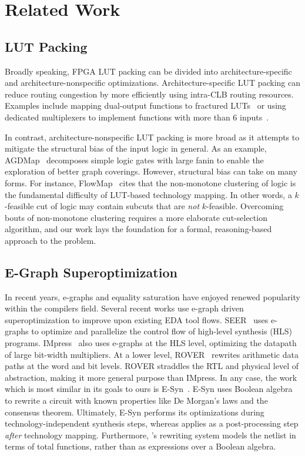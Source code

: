 \section{Related Work}\label{sec:relatedwork}
\subsection{LUT Packing}\label{sec:relatedwork:fpga}
Broadly speaking, FPGA LUT packing can be divided into architecture-specific
and architecture-nonspecific optimizations. Architecture-specific LUT packing
can reduce routing congestion by more efficiently using intra-CLB routing
resources. Examples include mapping dual-output functions to fractured
LUTs~\cite{fraclut} or using dedicated multiplexers to implement functions with
more than 6 inputs~\cite{ug574}.

In contrast, architecture-nonspecific LUT packing is more broad as it attempts
to mitigate the structural bias of the input logic in general. As an example,
AGDMap~\cite{adaptdecomp} decomposes simple logic gates with large fanin to
enable the exploration of better graph coverings. However, structural bias can
take on many forms. For instance, FlowMap~\cite{flowmap} cites that the
non-monotone clustering of logic is the fundamental difficulty of LUT-based
technology mapping. In other words, a $k$-feasible cut of logic may contain
subcuts that are \textit{not} $k$-feasible. Overcoming bouts of non-monotone
clustering requires a more elaborate cut-selection algorithm, and our work lays
the foundation for a formal, reasoning-based approach to the problem.

\subsection{E-Graph Superoptimization}\label{sec:relatedwork:egraph}
In recent years, e-graphs and equality saturation have enjoyed renewed
popularity within the compilers field. Several recent works use e-graph driven
superoptimization to improve upon existing EDA tool flows. SEER~\cite{seer}
uses e-graphs to optimize and parallelize the control flow of high-level
synthesis (HLS) programs. IMpress~\cite{impress} also uses e-graphs at the HLS
level, optimizing the datapath of large bit-width multipliers. At a lower
level, ROVER~\cite{rover,roverbl,egraphconstraints} rewrites arithmetic data
paths at the word and bit levels. ROVER straddles the RTL and physical level of
abstraction, making it more general purpose than IMpress. In any case, the work
which is most similar in its goals to ours is E-Syn~\cite{esynth}. E-Syn uses
Boolean algebra to rewrite a circuit with known properties like De Morgan's
laws and the consensus theorem. Ultimately, E-Syn performs its optimizations
during technology-independent synthesis steps, whereas \shortname{} applies as
a post-processing step \textit{after} technology mapping. Furthermore,
\shortname{}'s rewriting system models the netlist in terms of total functions,
rather than as expressions over a Boolean algebra.